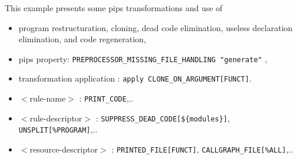 \documentclass[a4paper,12pt]{article}
\begin{document}
This example presents some pips transformations and use of 
\begin{itemize}
\item program restructuration, cloning, dead code elimination, useless
  declaration elimination, and code regeneration, 
\item pips property: \verb+PREPROCESSOR_MISSING_FILE_HANDLING "generate"+ , 
\item transformation application : \verb+apply CLONE_ON_ARGUMENT[FUNCT]+.
\item $<$rule-name$>$ : \verb+PRINT_CODE+,..
\item $<$rule-descriptor$>$ : 
  \verb+SUPPRESS_DEAD_CODE[${modules}]+,  \verb+UNSPLIT[%PROGRAM]+,..
\item $<$resource-descriptor$>$ :  \verb+PRINTED_FILE[FUNCT]+,  \verb+CALLGRAPH_FILE[%ALL]+,..
\end{itemize}
\end{document}
